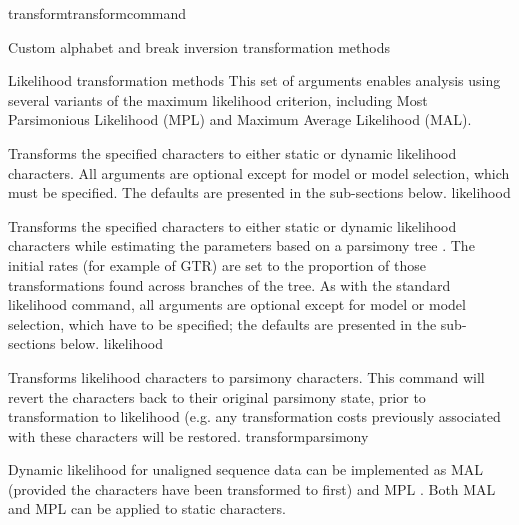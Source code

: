 \begin{command}{transform}{transformcommand}
\begin{arguments}
\begin{argumentgroup}{Custom alphabet and break inversion transformation methods}
\end{argumentgroup}


\begin{argumentgroup}{Likelihood transformation methods}
This set of arguments enables analysis using several variants of the
maximum likelihood criterion, including Most Parsimonious Likelihood (MPL)
and Maximum Average Likelihood (MAL). 

{Transforms the specified characters to either static or dynamic
likelihood characters. All arguments are optional except for model or model selection, 
which must be specified. The defaults are presented in the sub-sections below.}
{likelihood}

{Transforms the specified characters to either static or dynamic
likelihood characters while estimating the parameters based on a
parsimony tree \cite{wheeler2013}. The initial rates (for example of 
GTR) are set to the proportion of those transformations found
across branches of the tree. As with the standard likelihood command,
all arguments are optional except for model or model selection, which 
have to be specified; the defaults are presented in the sub-sections below.}
{likelihood}

{Transforms likelihood characters to parsimony characters.
This command will revert the characters back to their original
parsimony state, prior to transformation to likelihood (e.g. any 
transformation costs previously associated with these characters
will be restored.}
{transformparsimony}

\begin{statement}
Dynamic likelihood for unaligned sequence data can be 
implemented as MAL \cite{wheeler2013} (provided the characters 
have been transformed to  first) and
MPL \cite{barryandhartigan1987}. Both MAL and MPL can be 
applied to static characters.
\end{statement}


\end{argumentgroup}
\end{arguments}
\end{command}
